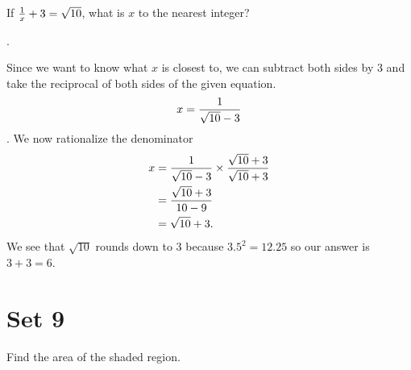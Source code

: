 \documentclass[11pt]{article}
\DeclareRobustCommand{\frac}[3][0pt]{%
  {\begingroup\hspace{#1}#2\hspace{#1}\endgroup\over\hspace{#1}#3\hspace{#1}}}
\begin{document}
\begin{problem}If $\frac{1}{x} + 3 = \sqrt{10}$, what is $x$ to the nearest integer?
\end{problem}

\begin{answer}
.
\end{answer}
\begin{solution}
Since we want to know what $x$ is closest to, we can subtract both sides by 3 and take the reciprocal of both sides of the given equation.
$$x = \frac{1}{\sqrt{10}-3}$$.
We now rationalize the denominator
\begin{align*}
x &= \frac{1}{\sqrt{10}-3} \times \frac{\sqrt{10}+3}{\sqrt{10}+3} \\
&= \frac{\sqrt{10}+3}{10-9} \\
&= \sqrt{10}+3.
\end{align*}
We see that $\sqrt{10}$ rounds down to 3 because $3.5^2 = 12.25$ so our answer is $3+3=\boxed{6}$.
\end{solution}

\eject

\section*{Set 9}

\begin{problem}Find the area of the shaded region.
	\begin{center}
	\end{center}
\end{problem}
\end{document}
